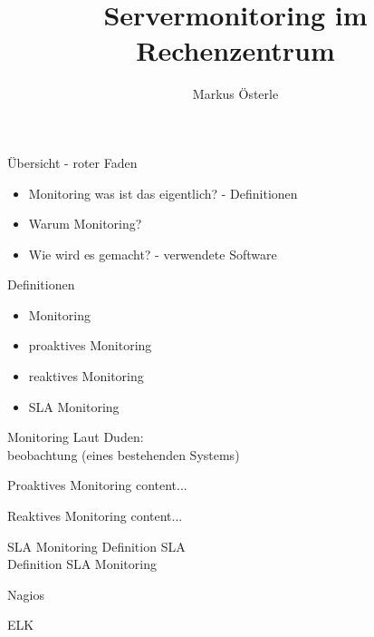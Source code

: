 \documentclass[11pt]{beamer}
\author{Markus Österle}
\title{Servermonitoring im Rechenzentrum}
\begin{document}
\begin{frame}
\titlepage
\end{frame}


\begin{frame}{Übersicht - roter Faden}
\begin{itemize}
	\item Monitoring was ist das eigentlich? - Definitionen
	\item Warum Monitoring?
	\item Wie wird es gemacht? - verwendete Software
\end{itemize}
\end{frame}
\begin{frame}{Definitionen}
\begin{itemize}
	\item Monitoring
	\item proaktives Monitoring
	\item reaktives Monitoring
	\item SLA Monitoring
\end{itemize}
\end{frame}
\begin{frame}{Monitoring}
	Laut Duden: \\
	
	\glqq [Dauer]beobachtung (eines bestehenden Systems)\grqq
\end{frame}
\begin{frame}{Proaktives Monitoring}
	content...
\end{frame}
\begin{frame}{Reaktives Monitoring}
	content...
\end{frame}
\begin{frame}{SLA Monitoring}
	Definition SLA \\
	Definition SLA Monitoring
\end{frame}
\begin{frame}{Nagios}

\end{frame}
\begin{frame}{ELK}

\end{frame}
\end{document}
